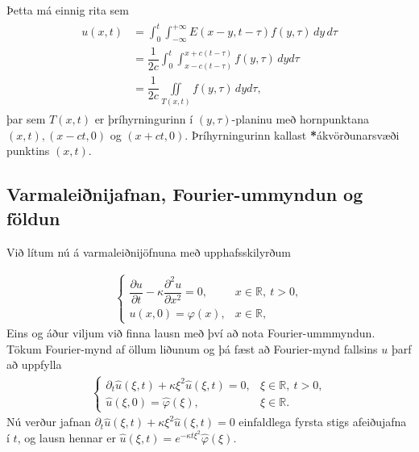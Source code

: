 \documentclass[a4paper,10pt,icelandic]{sphinxmanual}
\begin{document}
Þetta má einnig rita sem
\begin{equation*}
\begin{split}\begin{aligned}
u(x,t)
&=\int_0^t \int_{-\infty}^{+\infty} E(x-y,t-\tau)f(y,\tau)\, dy\,
d{\tau}\\
&=\dfrac 1{2c} \int_0^t \int_{x-c(t-\tau)}^{x+c(t-\tau)}
f(y,{\tau})\, dyd{\tau}\nonumber\\
&=\dfrac 1{2c}\iint\limits_{T(x,t)}f(y,{\tau})\, dyd{\tau},\nonumber\end{aligned}\end{split}
\end{equation*}
þar sem \(T(x,t)\) er þríhyrningurinn í \((y,\tau)\)-planinu með hornpunktana \((x, t), (x − ct, 0)\) og \((x + ct, 0)\). Þríhyrningurinn kallast {\color{red}\bfseries{}*}ákvörðunarsvæði punktins \((x,t)\).


\subsection{Varmaleiðnijafnan, Fourier-ummyndun og földun}
\label{\detokenize{Kafli04:varmaleinijafnan-fourier-ummyndun-og-foldun}}
Við lítum nú á varmaleiðnijöfnuna með upphafsskilyrðum

\label{\detokenize{Kafli04:upphafvarmi}}\begin{equation*}
\begin{split}\begin{cases}
\dfrac{{\partial}u}{\partial t}
-{\kappa}\dfrac{\partial^2u}{\partial x^2}=0, &x\in {{\mathbb  R}}, \ t>0,\\
u(x,0)={\varphi}(x), &x\in {{\mathbb  R}},
\end{cases}\end{split}
\end{equation*}
Eins og áður viljum við finna lausn með því að nota Fourier-ummmyndun. Tökum Fourier-mynd af öllum liðunum og þá fæst að Fourier-mynd fallsins \(u\) þarf að uppfylla
\begin{equation*}
\begin{split}\begin{cases}
\partial_t\widehat u({\xi},t)
+{\kappa}{\xi}^2\widehat u({\xi},t)=0, &{\xi}\in {{\mathbb  R}}, \ t>0,\\
\widehat u({\xi},0)=\widehat {\varphi}({\xi}), &{\xi}\in {{\mathbb  R}}.
\end{cases}\end{split}
\end{equation*}
Nú verður jafnan \(\partial_t\widehat u({\xi},t)+{\kappa}{\xi}^2\widehat u({\xi},t)=0\) einfaldlega fyrsta stigs afeiðujafna í \(t\), og lausn hennar er \(\widehat u({\xi},t)=e^{-{\kappa}t{\xi}^2}\widehat {\varphi}({\xi})\).
\end{document}
